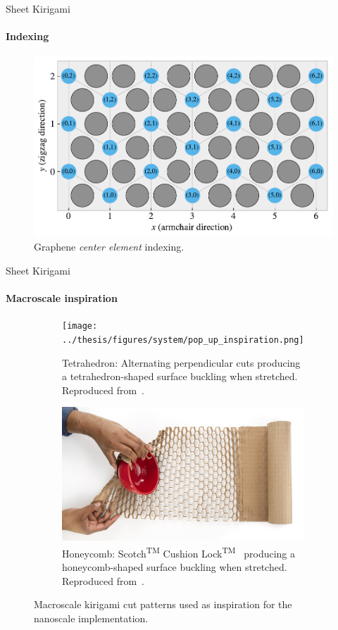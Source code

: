 \documentclass[
	10pt, %
]{beamer}
\begin{document}
%
%
\begin{frame}{Sheet Kirigami}
	\framesubtitle{Indexing}
	\vspace*{5mm}
	\begin{figure}[H]
		\centering
		\includegraphics[width=0.7\linewidth]{../thesis/figures/system/center_indexing.pdf}
		\caption{Graphene \textit{center element} indexing.}
	\end{figure}	
\end{frame}
%
%
\begin{frame}{Sheet Kirigami}
	\framesubtitle{Macroscale inspiration}
	\vspace*{5mm}
	\begin{figure}[H]
		\centering
		\begin{subfigure}[t]{0.48\textwidth}
			\centering
			\texttt{[image: ../thesis/figures/system/pop\_up\_inspiration.png]}
			\caption{Tetrahedron: Alternating perpendicular cuts producing a tetrahedron-shaped surface buckling when stretched. Reproduced from~\cite{new_pop_up}. }
		\end{subfigure}
		\hfill
		\begin{subfigure}[t]{0.48\textwidth}
			\centering
			\includegraphics[width=\textwidth]{../thesis/figures/system/honeycomb_inspiration.jpg}
			\caption{Honeycomb: Scotch\textsuperscript{TM} Cushion Lock\textsuperscript{TM}~\cite{cushion_wrap} producing a honeycomb-shaped surface buckling when stretched. Reproduced from~\cite{cushion_wrap}.}
		\end{subfigure}
		\hfill
		\caption{Macroscale kirigami cut patterns used as inspiration for the nanoscale implementation.}
	  \end{figure}
\end{frame}
\end{document}
